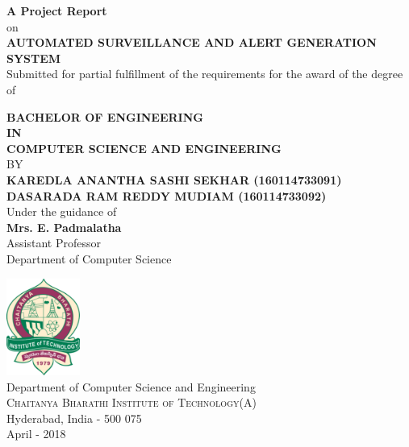 \begin{titlepage}

\begin{center}

\textup{\small {\bf A Project Report} \\ on}\\[0.2in]

\Large \textbf {AUTOMATED SURVEILLANCE AND ALERT GENERATION SYSTEM}\\[0.5in]

       \small Submitted for partial fulfillment of the requirements for the award of the degree of
        \vspace{.2in}

       {\bf BACHELOR OF ENGINEERING \\IN\\ COMPUTER SCIENCE AND ENGINEERING}\\[0.2in]

\normalsize BY \\
\vspace{.1in}
\textbf{KAREDLA ANANTHA SASHI SEKHAR (160114733091)}\\
\textbf{DASARADA RAM REDDY MUDIAM (160114733092)}\\

\vspace{.1in}
Under the guidance of\\
{\textbf{Mrs. E. Padmalatha}}\\
Assistant Professor\\
Department of Computer Science\\[0.2in]
\vfill

\includegraphics[width=0.18\textwidth]{./cbit-logo}\\[0.1in]
\Large{Department of Computer Science and Engineering}\\
\normalsize
\textsc{Chaitanya Bharathi Institute of Technology(A)}\\
Hyderabad, India - 500 075 \\
April - 2018

\end{center}

\end{titlepage}
